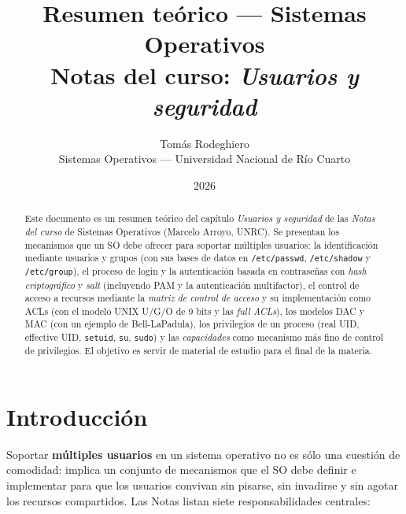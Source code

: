 \documentclass[11pt,a4paper]{article}
\title{
    \vspace{-2.5em}
    \textbf{Resumen teórico --- Sistemas Operativos} \\[0.3em]
    \large Notas del curso: \emph{Usuarios y seguridad}
}
\author{
    Tomás Rodeghiero \\
    \small Sistemas Operativos --- Universidad Nacional de Río Cuarto
}
\date{2026}
\begin{document}
\maketitle

\begin{abstract}
\noindent
Este documento es un resumen teórico del capítulo \emph{Usuarios y
seguridad} de las \emph{Notas del curso} de Sistemas Operativos
(Marcelo Arroyo, UNRC). Se presentan los mecanismos que un SO debe
ofrecer para soportar múltiples usuarios: la identificación mediante
usuarios y grupos (con sus bases de datos en \texttt{/etc/passwd},
\texttt{/etc/shadow} y \texttt{/etc/group}), el proceso de login y la
autenticación basada en contraseñas con \emph{hash criptográfico} y
\emph{salt} (incluyendo PAM y la autenticación multifactor), el control
de acceso a recursos mediante la \emph{matriz de control de acceso} y
su implementación como ACLs (con el modelo UNIX U/G/O de 9 bits y las
\emph{full ACLs}), los modelos DAC y MAC (con un ejemplo de
Bell-LaPadula), los privilegios de un proceso (real UID, effective
UID, \texttt{setuid}, \texttt{su}, \texttt{sudo}) y las
\emph{capacidades} como mecanismo más fino de control de privilegios.
El objetivo es servir de material de estudio para el final de la
materia.
\end{abstract}

\tableofcontents
\bigskip

\section{Introducción}

Soportar \textbf{múltiples usuarios} en un sistema operativo no es sólo
una cuestión de comodidad: implica un conjunto de mecanismos que el SO
debe definir e implementar para que los usuarios convivan sin pisarse,
sin invadirse y sin agotar los recursos compartidos. Las Notas listan
siete responsabilidades centrales:
\end{document}
